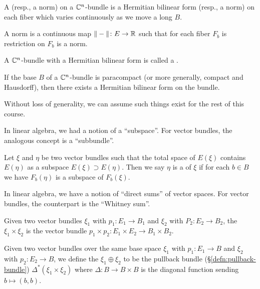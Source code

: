 \begin{definition}
A  (resp., a norm) on a $\mathbb{C}^{n}$-bundle is a
Hermitian bilinear form (resp., a norm) on each fiber which varies continuously as we
move a long $B$.

A norm is a continuous map $\|-\|\colon E\to\mathbb{R}$ such that for each
fiber $F_{b}$ is restriction on $F_{b}$ is a norm.
\end{definition}

\begin{definition}
A $\mathbb{C}^{n}$-bundle with a Hermitian bilinear form is called a
.
\end{definition}

\begin{lemma}
If the base $B$ of a $\mathbb{C}^{n}$-bundle is paracompact (or more
generally, compact and Hausdorff), then there exists a Hermitian
bilinear form on the bundle.
\end{lemma}

Without loss of generality, we can assume such things exist for the
rest of this course.

\begin{node}
In linear algebra, we had a notion of a ``subspace''. For vector
bundles, the analogous concept is a ``subbundle''.
\end{node}

\begin{definition}
Let $\xi$ and $\eta$ be two vector bundles such that the total space
of $E(\xi)$ contains $E(\eta)$ as a subspace $E(\xi)\supset E(\eta)$.
Then we say $\eta$ is a  of $\xi$ if for each $b\in B$
we have $F_{b}(\eta)$ is a subspace of $F_{b}(\xi)$.
\end{definition}

\begin{node}
In linear algebra, we have a notion of ``direct sums'' of vector
spaces. For vector bundles, the counterpart is the ``Whitney sum''.
\end{node}

\begin{definition}
Given two vector bundles $\xi_{1}$ with $p_{1}\colon E_{1}\to B_{1}$
and $\xi_{2}$ with $P_{2}\colon E_{2}\to B_{2}$, the 
$\xi_{1}\times\xi_{2}$ is the vector bundle $p_{1}\times p_{2}\colon E_{1}\times E_{2}\to B_{1}\times B_{2}$.
\end{definition}

\begin{definition}
Given two vector bundles over the same base space $\xi_{1}$ with
$p_{1}\colon E_{1}\to B$ and $\xi_{2}$ with $p_{2}\colon E_{2}\to B$,
we define the  $\xi_{1}\oplus\xi_{2}$ to be the
pullback bundle (\S\ref{defn:pullback-bundle}) $\Delta^{*}(\xi_{1}\times\xi_{2})$ where
$\Delta\colon B\to B\times B$ is the diagonal function sending $b\mapsto(b,b)$.
\end{definition}